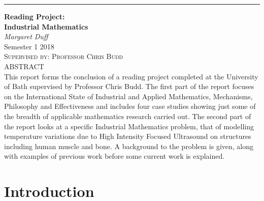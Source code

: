 \documentclass[11pt]{article} %
\begin{document}
	\begin{titlepage} %
	
	\raggedleft %
	
	\rule{1pt}{\textheight} %
	\hspace{0.05\textwidth} %
	\parbox[b]{0.75\textwidth}{ %
		
		{\Huge\bfseries Reading Project: \\[0.5\baselineskip] Industrial Mathematics}\\[2\baselineskip] %
		{\large\textit{Margaret Duff}}\\[3\baselineskip] %
		{\large{Semester 1 2018}}\\[3\baselineskip] %
		{\Large\textsc{Supervised by: Professor Chris Budd}}\\[4\baselineskip] %
		{ABSTRACT}\\[1\baselineskip]
		{This report forms the conclusion of a reading project completed at the University of Bath supervised by Professor Chris Budd. 
			The first part of the report focuses on the International State of Industrial and Applied Mathematics, Mechanisms, Philosophy and Effectiveness and includes four case studies showing just some of the breadth of applicable mathematics research carried out. The second part of the report looks at a specific Industrial Mathematics problem, that of modelling temperature variations due to High Intensity Focused Ultrasound on structures including human muscle and bone. A background to the problem is given, along with examples of previous work before some current work is explained.  }\\[4\baselineskip]			
	}
	
	\end{titlepage}

\pagebreak
	\tableofcontents 
	\pagebreak
	\section{Introduction}
	
\end{document}
